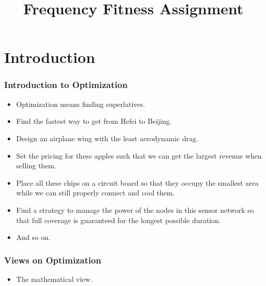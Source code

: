 \documentclass[aspectratio=169,mathserif,notheorems]{beamer}%
\title{Frequency Fitness Assignment}%
\begin{document}
%
\startPresentation%
%
\section{Introduction}%
%
\begin{frame}%
\frametitle{Introduction to Optimization}%
\begin{itemize}%
\item Optimization means finding superlatives.%
\item<2-> Find the \alert{fastest} way to get from Hefei to Beijing.%
\item<3-> Design an airplane wing with the \alert{least} aerodynamic drag.%
\item<4-> Set the pricing for these apples such that we can get the \alert{largest} revenue when selling them.%
\item<5-> Place all these chips on a circuit board so that they occupy the \alert{smallest} area while we can still properly connect and cool them.%
\item<6-> Find a strategy to manage the power of the nodes in this sensor network so that full coverage is guaranteed for the \alert{longest} possible duration.%
\item<7-> And so on.%
\end{itemize}%
%
%
\end{frame}%
%
\begin{frame}[t]%
\frametitle{Views on Optimization}%
\begin{itemize}%
%
%
\item<3-> The mathematical view.%
\end{itemize}%
%
%
\end{frame}%
\end{document}
